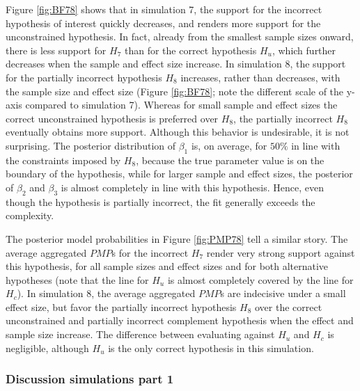 \documentclass[review, 3p, authoryear]{elsarticle} %
\begin{document}
Figure \ref{fig:BF78} shows that in simulation 7, the support for the incorrect hypothesis of interest quickly decreases, and renders more support for the unconstrained hypothesis.
In fact, already from the smallest sample sizes onward, there is less support for \(H_7\) than for the correct hypothesis \(H_u\), which further decreases when the sample and effect size increase.
In simulation 8, the support for the partially incorrect hypothesis \(H_8\) increases, rather than decreases, with the sample size and effect size (Figure \ref{fig:BF78}; note the different scale of the y-axis compared to simulation 7).
Whereas for small sample and effect sizes the correct unconstrained hypothesis is preferred over \(H_8\), the partially incorrect \(H_8\) eventually obtains more support.
Although this behavior is undesirable, it is not surprising.
The posterior distribution of \(\beta_1\) is, on average, for \(50\%\) in line with the constraints imposed by \(H_8\), because the true parameter value is on the boundary of the hypothesis, while for larger sample and effect sizes, the posterior of \(\beta_2\) and \(\beta_3\) is almost completely in line with this hypothesis.
Hence, even though the hypothesis is partially incorrect, the fit generally exceeds the complexity.

The posterior model probabilities in Figure \ref{fig:PMP78} tell a similar story.
The average aggregated \(PMP\)s for the incorrect \(H_7\) render very strong support against this hypothesis, for all sample sizes and effect sizes and for both alternative hypotheses (note that the line for \(H_u\) is almost completely covered by the line for \(H_c\)).
In simulation 8, the average aggregated \(PMP\)s are indecisive under a small effect size, but favor the partially incorrect hypothesis \(H_8\) over the correct unconstrained and partially incorrect complement hypothesis when the effect and sample size increase.
The difference between evaluating against \(H_u\) and \(H_c\) is negligible, although \(H_u\) is the only correct hypothesis in this simulation.

\hypertarget{discussion-simulations-part-1}{%
\subsubsection{Discussion simulations part 1}\label{discussion-simulations-part-1}}
\end{document}
